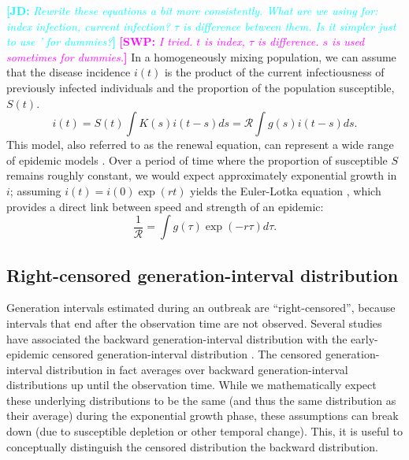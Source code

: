 \documentclass[12pt]{article}
\newcommand{\RR}{\ensuremath{{\mathcal R}}}
\newcommand{\comment}[3]{\textcolor{#1}{\textbf{[#2: }\textsl{#3}\textbf{]}}}
\newcommand{\jd}[1]{\comment{cyan}{JD}{#1}}
\newcommand{\swp}[1]{\comment{magenta}{SWP}{#1}}
\begin{document}
\jd{Rewrite these equations a bit more consistently. What are we using for: index infection, current infection? $\tau$ is difference between them. Is it simpler just to use ' for dummies?}
\swp{I tried. $t$ is index, $\tau$ is difference. $s$ is used sometimes for dummies.}
In a homogeneously mixing population, we can assume that the disease incidence $i(t)$ is the product of the current infectiousness of previously infected individuals and the proportion of the population susceptible, $S(t)$.
\begin{equation}
i(t) = S(t) \int K(s) i(t-s) ds = \RR \int g(s) i(t-s) ds.
\end{equation}
This model, also referred to as the renewal equation, can represent a wide range of epidemic models \citep{heesterbeek1996concept, diekmann2000mathematical, roberts2004modelling, aldis2005integral, wallinga2007generation, roberts2007model}.
Over a period of time where the proportion of susceptible $S$ remains roughly constant, we would expect approximately exponential growth in $i$; assuming $i(t) = i(0) \exp(r t)$ yields the Euler-Lotka equation \citep{lotka1907relation}, which provides a direct link between speed and strength of an epidemic:
\begin{equation}
\frac{1}{\RR} = \int g(\tau) \exp(-r \tau) d\tau.
\end{equation}

\subsection{Right-censored generation-interval distribution}

Generation intervals estimated during an outbreak are ``right-censored'', because intervals that end after the observation time are not observed. 
Several studies have associated the backward generation-interval distribution with the early-epidemic censored generation-interval distribution \citep{tomba2010some, nishiura2010time, champredon2015intrinsic, britton2019estimation}. 
The censored generation-interval distribution in fact averages over backward generation-interval distributions up until the observation time.
While we mathematically expect these underlying distributions to be the same (and thus the same distribution as their average) during the exponential growth phase, these assumptions can break down (due to susceptible depletion or other temporal change).
This, it is useful to conceptually distinguish the censored distribution the backward distribution.
\end{document}
